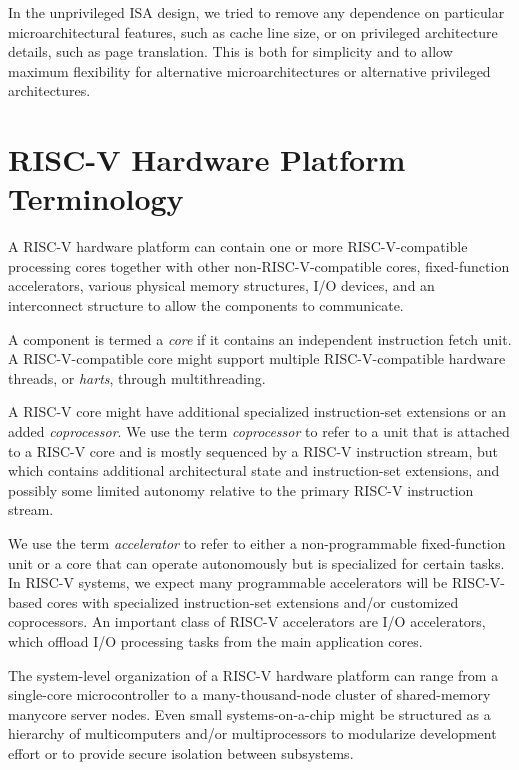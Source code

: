 \begin{commentary}
In the unprivileged ISA design, we tried to remove any dependence on
particular microarchitectural features, such as cache line size, or on
privileged architecture details, such as page translation.  This is
both for simplicity and to allow maximum flexibility for alternative
microarchitectures or alternative privileged architectures.
\end{commentary}


\section{RISC-V Hardware Platform Terminology}

A RISC-V hardware platform can contain one or more RISC-V-compatible
processing cores together with other non-RISC-V-compatible cores,
fixed-function accelerators, various physical memory structures, I/O
devices, and an interconnect structure to allow the components to
communicate.

A component is termed a {\em core} if it contains an independent
instruction fetch unit.  A RISC-V-compatible core might support
multiple RISC-V-compatible hardware threads, or {\em harts}, through
multithreading.

A RISC-V core might have additional specialized instruction-set
extensions or an added {\em coprocessor}.  We use the term {\em
  coprocessor} to refer to a unit that is attached to a RISC-V core
and is mostly sequenced by a RISC-V instruction stream, but which
contains additional architectural state and instruction-set
extensions, and possibly some limited autonomy relative to the
primary RISC-V instruction stream.

We use the term {\em accelerator} to refer to either a
non-programmable fixed-function unit or a core that can operate
autonomously but is specialized for certain tasks.  In RISC-V systems,
we expect many programmable accelerators will be RISC-V-based cores
with specialized instruction-set extensions and/or customized
coprocessors.  An important class of RISC-V accelerators are I/O
accelerators, which offload I/O processing tasks from the main
application cores.

The system-level organization of a RISC-V hardware platform can range
from a single-core microcontroller to a many-thousand-node cluster of
shared-memory manycore server nodes.  Even small systems-on-a-chip
might be structured as a hierarchy of multicomputers and/or
multiprocessors to modularize development effort or to provide secure
isolation between subsystems.

